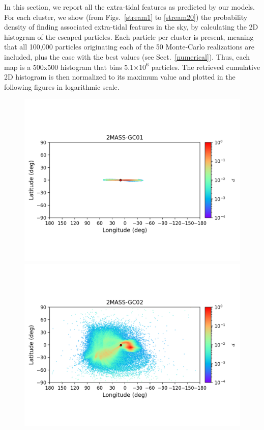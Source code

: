         In this section, we report all the extra-tidal features as predicted by our models. For each cluster, we show (from Figs.~\ref{stream1} to \ref{stream20}) the probability density of finding associated extra-tidal features in the sky, by calculating the 2D histogram of the escaped particles. Each particle per cluster is present, meaning that all 100,000 particles originating each of the 50 Monte-Carlo realizations are included, plus the case with the best values (see Sect.~\ref{numerical}). Thus, each map is a 500x500 histogram that bins 5.1$\times10^6$ particles. The retrieved cumulative 2D histogram is then normalized to its maximum value and plotted in the following figures in logarithmic scale. 
        \twocolumn
        \begin{figure}
            \begin{center}
                \includegraphics[clip=true, trim = 0mm 20mm 0mm 10mm, width=1\columnwidth]{images/error_plots_2MASS-GC01.png}
                \includegraphics[clip=true, trim = 0mm 20mm 0mm 10mm, width=1\columnwidth]{images/error_plots_2MASS-GC02.png}

\end{center}
\end{figure}
